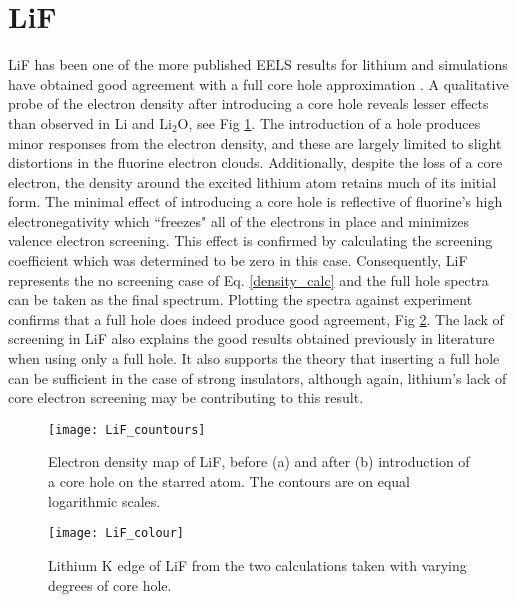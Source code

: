\section{LiF}
LiF has been one of the more published EELS results for lithium and simulations have obtained good agreement with a full core hole approximation \cite{gao_theory_2008, mauchamp_ab_2006}.  A qualitative probe of the electron density after introducing a core hole reveals lesser effects than observed in Li and $ \mathrm{Li_2O} $, see Fig \ref{LiF_countours}.  The introduction of a hole produces minor responses from the electron density, and these are largely limited to slight distortions in the fluorine electron clouds. Additionally, despite the loss of a core electron, the density around the excited lithium atom retains much of its initial form. The minimal effect of introducing a core hole is reflective of fluorine's high electronegativity which ``freezes" all of the electrons in place and minimizes valence electron screening.  This effect is confirmed by calculating the screening coefficient which was determined to be zero in this case. Consequently, LiF represents the no screening case of Eq. \ref{density_calc} and the full hole spectra can be taken as the final spectrum.  Plotting the spectra against experiment confirms that a full hole does indeed produce good agreement, Fig \ref{LiF_spectra}.  The lack of screening in LiF also explains the good results obtained previously in literature when using only a full hole.  It also supports the theory that inserting a full hole can be sufficient in the case of strong insulators, although again, lithium's lack of core electron screening may be contributing to this result.

\begin{figure}
	\centering
	\texttt{[image: LiF\_countours]}
	\caption{Electron density map of LiF, before (a) and after (b) introduction of a core hole on the starred atom.  The contours are on equal logarithmic scales.}
	\label{LiF_countours}
\end{figure}

\begin{figure}
	\centering
	\texttt{[image: LiF\_colour]}
	\caption{Lithium K edge of LiF from the two calculations taken with varying degrees of core hole. }
	\label{LiF_spectra}
\end{figure}



